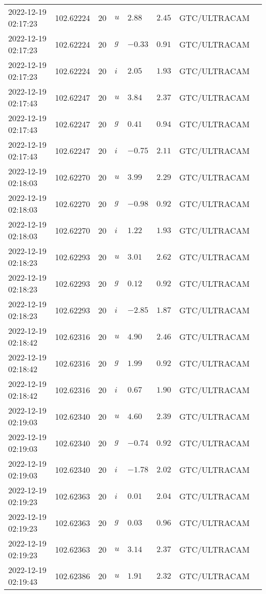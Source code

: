 \documentclass{nature_plusfigure}
\begin{document}
\begin{supplement}
\begin{center}
\begin{longtable}{llllllll}
2022-12-19 02:17:23 & 102.62224 & 20 & $u$ & $2.88$ & $2.45$ & GTC/ULTRACAM &  \\ 
2022-12-19 02:17:23 & 102.62224 & 20 & $g$ & $-0.33$ & $0.91$ & GTC/ULTRACAM &  \\ 
2022-12-19 02:17:23 & 102.62224 & 20 & $i$ & $2.05$ & $1.93$ & GTC/ULTRACAM &  \\ 
2022-12-19 02:17:43 & 102.62247 & 20 & $u$ & $3.84$ & $2.37$ & GTC/ULTRACAM &  \\ 
2022-12-19 02:17:43 & 102.62247 & 20 & $g$ & $0.41$ & $0.94$ & GTC/ULTRACAM &  \\ 
2022-12-19 02:17:43 & 102.62247 & 20 & $i$ & $-0.75$ & $2.11$ & GTC/ULTRACAM &  \\ 
2022-12-19 02:18:03 & 102.62270 & 20 & $u$ & $3.99$ & $2.29$ & GTC/ULTRACAM &  \\ 
2022-12-19 02:18:03 & 102.62270 & 20 & $g$ & $-0.98$ & $0.92$ & GTC/ULTRACAM &  \\ 
2022-12-19 02:18:03 & 102.62270 & 20 & $i$ & $1.22$ & $1.93$ & GTC/ULTRACAM &  \\ 
2022-12-19 02:18:23 & 102.62293 & 20 & $u$ & $3.01$ & $2.62$ & GTC/ULTRACAM &  \\ 
2022-12-19 02:18:23 & 102.62293 & 20 & $g$ & $0.12$ & $0.92$ & GTC/ULTRACAM &  \\ 
2022-12-19 02:18:23 & 102.62293 & 20 & $i$ & $-2.85$ & $1.87$ & GTC/ULTRACAM &  \\ 
2022-12-19 02:18:42 & 102.62316 & 20 & $u$ & $4.90$ & $2.46$ & GTC/ULTRACAM &  \\ 
2022-12-19 02:18:42 & 102.62316 & 20 & $g$ & $1.99$ & $0.92$ & GTC/ULTRACAM &  \\ 
2022-12-19 02:18:42 & 102.62316 & 20 & $i$ & $0.67$ & $1.90$ & GTC/ULTRACAM &  \\ 
2022-12-19 02:19:03 & 102.62340 & 20 & $u$ & $4.60$ & $2.39$ & GTC/ULTRACAM &  \\ 
2022-12-19 02:19:03 & 102.62340 & 20 & $g$ & $-0.74$ & $0.92$ & GTC/ULTRACAM &  \\ 
2022-12-19 02:19:03 & 102.62340 & 20 & $i$ & $-1.78$ & $2.02$ & GTC/ULTRACAM &  \\ 
2022-12-19 02:19:23 & 102.62363 & 20 & $i$ & $0.01$ & $2.04$ & GTC/ULTRACAM &  \\ 
2022-12-19 02:19:23 & 102.62363 & 20 & $g$ & $0.03$ & $0.96$ & GTC/ULTRACAM &  \\ 
2022-12-19 02:19:23 & 102.62363 & 20 & $u$ & $3.14$ & $2.37$ & GTC/ULTRACAM &  \\ 
2022-12-19 02:19:43 & 102.62386 & 20 & $u$ & $1.91$ & $2.32$ & GTC/ULTRACAM &  \\ 

\end{longtable}
\end{center}
\end{supplement}
\end{document}
